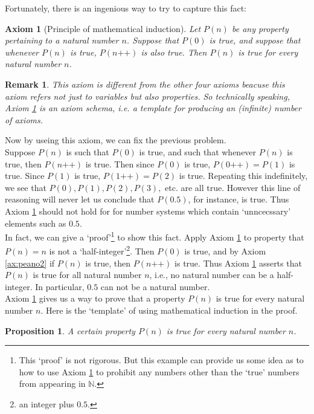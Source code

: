 \documentclass[a4paper,oneside]{book}
\newtheorem{axiom}{Axiom}[chapter]
\newtheorem{remark}{Remark}[section]
\newtheorem{proposition}{Proposition}[section]
\begin{document}
			Fortunately, there is an ingenious way to try to capture this fact:
			\begin{axiom}[Principle of mathematical induction]
				\label{ax:peano5}
				Let $P(n)$ be any property pertaining to a natural number $n$. Suppose that $P(0)$ is true, and suppose that whenever $P(n)$ is true, $P(n\texttt{++})$ is also true. Then $P(n)$ is true for every natural number $n$.
      \end{axiom}
			\begin{remark}
				This axiom is different from the other four axioms beacuse this axiom refers not just to \textit{variables} but also \textit{properties}. So technically speaking, Axiom \ref{ax:peano5} is an \textit{axiom schema}, i.e. a template for producing an (infinite) number of axioms.
			\end{remark}
			Now by useing this axiom, we can fix the previous problem.\\
			Suppose $P(n)$ is such that $P(0)$ is true, and such that whenever $P(n)$ is true, then $P(n \texttt{++})$ is true. Then since $P(0)$ is true, $P(0 \texttt{++}) = P(1)$ is true. Since $P(1)$ is true, $P(1 \texttt{++}) = P(2)$ is true. Repeating this indefinitely, we see that $P(0), P(1), P(2), P(3),$ etc. are all true. However this line of reasoning will never let us conclude that $P(0.5)$, for instance, is true. Thus Axiom \ref{ax:peano5} should not hold for for number systems which contain `unncecssary' elements such as $0.5$.\\
			In fact, we can give a `proof'\footnote{This `proof' is not rigorous. But this example can provide us some idea as to how to use Axiom \ref{ax:peano5} to prohibit any numbers other than the `true' numbers from appearing in $\mathbb{N}$.} to show this fact. Apply Axiom \ref{ax:peano5} to property that $P(n)= n$ is not a `half-integer'\footnote{an integer plus $0.5$.}. Then $P(0)$ is true, and by Axiom \ref{ax:peano2} if $P(n)$ is true, then $P(n\texttt{++})$ is true. Thus Axiom \ref{ax:peano5} asserts that $P(n)$ is true for all natural number $n$, i.e., no natural number can be a half-integer. In particular, $0.5$ can not be a natural number.\\
			Axiom \ref{ax:peano5} gives us a way to prove that a property $P(n)$ is true for every natural number $n$. Here is the `template' of using mathematical induction in the proof.
			\begin{proposition}
				A certain property $P(n)$ is true for every natural number $n$.
			\end{proposition}
\end{document}
